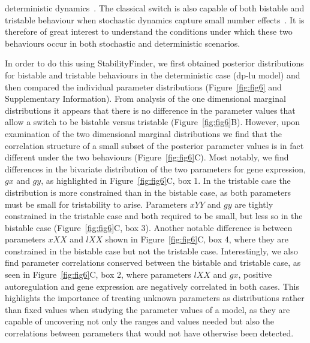 deterministic dynamics~\autocite{Guantes:2008gs}. The classical switch is also capable of both bistable and tristable behaviour when stochastic dynamics capture small number effects~\autocite{Ma:2012dt}. It is therefore of great interest to understand the conditions under which these two behaviours occur in both stochastic and deterministic scenarios. 
\par
In order to do this using StabilityFinder, we first obtained posterior distributions for bistable and tristable behaviours in the deterministic case (\acrshort{dp-lu} model) and then compared the individual parameter distributions (Figure~\ref{fig:fig6} and Supplementary Information). From analysis of the one dimensional marginal distributions it appears that there is no difference in the parameter values that allow a switch to be bistable versus tristable (Figure~\ref{fig:fig6}B). However, upon examination of the two dimensional marginal distributions we find that the correlation structure of a small subset of the posterior parameter values is in fact different under the two behaviours (Figure~\ref{fig:fig6}C). Most notably, we find differences in the bivariate distribution of the two parameters for gene expression, $gx$ and $gy$, as highlighted in Figure~\ref{fig:fig6}C, box 1. In the tristable case the distribution is more constrained than in the bistable case, as both parameters must be small for tristability to arise. 
Parameters $xYY$ and $gy$ are tightly constrained in the tristable case and both required to be small, but less so in the bistable case (Figure~\ref{fig:fig6}C, box 3). Another notable difference is between parameters $xXX$ and $lXX$ shown in Figure~\ref{fig:fig6}C, box 4, where they are constrained in the bistable case but not the tristable case. Interestingly, we also find parameter correlations conserved between the bistable and tristable case, as seen in Figure~\ref{fig:fig6}C, box 2, where parameters $lXX$ and $gx$, positive autoregulation and gene expression are negatively correlated in both cases.  This highlights the importance of treating unknown parameters as distributions rather than fixed values when studying the parameter values of a model, as they are capable of uncovering not only the ranges and values needed but also the correlations between parameters that would not have otherwise been detected.

